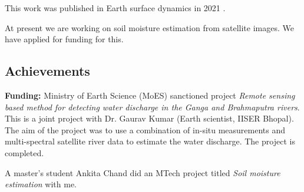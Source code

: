 \documentclass[a4paper,10pt]{article}
\theoremstyle{open}
\begin{document}
This work was published in Earth surface dynamics in 2021 \cite{esd21}.

At present we are working on soil moisture estimation from satellite images. We have applied for funding for this.

\subsection{Achievements}
\textbf{Funding:} Ministry of Earth Science (MoES) sanctioned project \emph{Remote sensing based method
for detecting water discharge in the Ganga and Brahmaputra rivers}. This is a joint
project with Dr. Gaurav Kumar (Earth scientist, IISER Bhopal). The aim of the
project was to use a combination of in-situ measurements and multi-spectral satellite
river data to estimate the water discharge. The project is completed.

A master's student Ankita Chand did an MTech project titled \emph{Soil moisture estimation} with me.



\end{document}

